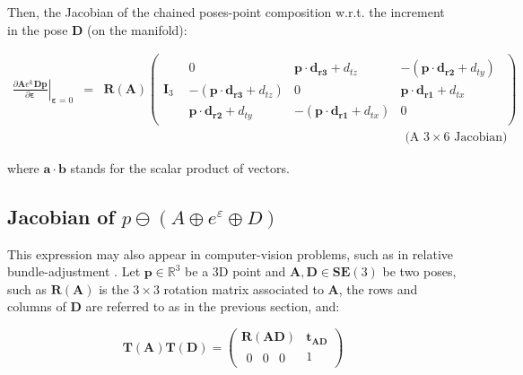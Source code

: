\documentclass[a4paper,11pt]{report}
\newcommand{\E}{{\bm{\varepsilon}}}
\newcommand{\A}{{\mathbf{A}}}
\newcommand{\D}{{\mathbf{D}}}
\newcommand{\I}{{\mathbf{I}}}
\begin{document}
Then, the Jacobian of the chained poses-point composition w.r.t. 
the increment in the pose $\D$ (on the manifold):

\begin{eqnarray}
\left. \frac{\partial \A e^\E \D \mathbf{p}}{\partial \E} \right|_{\E = 0}
&=&
\mathbf{R}(\A)
\left(
\begin{array}{c|c}
  \I_3 &
    \begin{array}{ccc}
      0  & \mathbf{p} \cdot \mathbf{d_{r3}} + d_{tz}  & -(\mathbf{p} \cdot \mathbf{d_{r2}} + d_{ty}) \\
      -(\mathbf{p} \cdot \mathbf{d_{r3}} + d_{tz})  & 0 & \mathbf{p} \cdot \mathbf{d_{r1}} + d_{tx} \\
      \mathbf{p} \cdot \mathbf{d_{r2}} + d_{ty}  & -(\mathbf{p} \cdot \mathbf{d_{r1}} + d_{tx}) & 0 
    \end{array}
\end{array}
\right)
\\
&&
\quad \quad \quad \quad \quad \quad \quad \quad \quad \quad \quad \quad 
\quad \quad \quad \quad \quad \quad \quad \quad \quad \quad \quad \quad 
\text{(A $3 \times 6$ Jacobian)} \nonumber 
\end{eqnarray}

\noindent where $\mathbf{a} \cdot \mathbf{b}$ stands for the scalar product of vectors.



\subsection{Jacobian of $p \ominus (A \oplus e^\varepsilon \oplus D)$}

This expression may also appear in computer-vision problems, 
such as in relative bundle-adjustment \cite{sibley2009rba}.
Let $\mathbf{p} \in \mathbb{R}^3$ be a 3D point
and $\A,\D \in \mathbf{SE}(3)$ be two poses, such as 
$\mathbf{R}(\A)$ is the $3\times 3$ rotation matrix associated to $\A$, 
the rows and columns of $\D$ are referred to as in the previous section, 
and:

\begin{equation}
\mathbf{T}(\A) \mathbf{T}(\D)
= 
\left(
\begin{array}{c|c}
 \mathbf{R}(\A\D) & \mathbf{t_{AD}} \\
\hline 
 \begin{array}{ccc} 0 & 0 & 0 \end{array} & 1
\end{array}
\right)
\end{equation}
\end{document}
